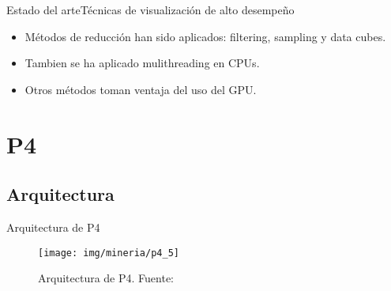 \documentclass[10pt]{beamer}
\newcommand{\1}{
	\setbeamertemplate{background}{
		\texttt{[image: img/1]}
		\tikz[overlay] \fill[fill opacity=0.75,fill=white] (0,0) rectangle (-\paperwidth,\paperheight);
	}
}
\begin{document}
\begin{frame}{Estado del arte}{Técnicas de visualización de alto desempeño}	
\begin{itemize}
	\item Métodos de reducción han sido aplicados: filtering, sampling y data cubes. \pause
	\item Tambien se ha aplicado mulithreading en CPUs. \pause
	\item Otros métodos toman ventaja del uso del GPU. \pause
\end{itemize}
\end{frame}


\section{P4}

\subsection{Arquitectura}


\begin{frame}{Arquitectura de P4}
\begin{figure}[]
	\centering
	\texttt{[image: img/mineria/p4\_5]}
	\caption{Arquitectura de P4. Fuente: \cite{li2018p4}}
\end{figure}	
\end{frame}
\end{document}
